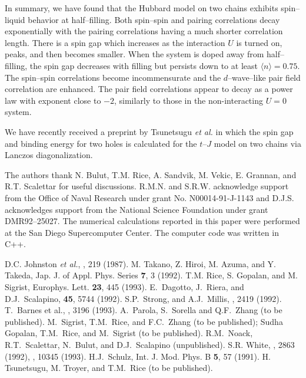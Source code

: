 In summary, we have found that
the Hubbard model on two chains exhibits spin--liquid behavior at
half--filling.
Both spin--spin and pairing correlations decay
exponentially with the pairing correlations having a much shorter
correlation length.
There is a spin gap which increases as the interaction $U$ is turned on,
peaks, and then becomes smaller.
When the system is doped away from half--filling, the spin gap
decreases with filling but persists down to at least
$\langle n \rangle = 0.75$.
The spin--spin
correlations become incommensurate and the $d$--wave--like pair field
correlation are enhanced.
The pair field correlations appear to decay as a power law with
exponent close to $-2$, similarly to those in the non-interacting
$U=0$ system.

We have recently received a preprint by Tsunetsugu {\sl et al.}
\cite{tsunetsugu} in which the spin gap and binding energy for two
holes is
calculated for the $t$--$J$ model on two chains via Lanczos
diagonalization.


The authors thank N. Bulut, T.M. Rice, A. Sandvik, M. Vekic, E.
Grannan, and R.T. Scalettar for useful discussions.
R.M.N. and S.R.W. acknowledge support from the Office of Naval
Research under grant No. N00014-91-J-1143 and D.J.S. acknowledges support
from the National Science Foundation under grant DMR92--25027.
The numerical calculations reported in this paper were performed at
the San Diego Supercomputer Center.
The computer code was written in C++.

\newpage
\begin{references}

 D.C. Johnston {\it et al.}, , 219 (1987).
 M. Takano, Z. Hiroi, M. Azuma, and Y. Takeda, Jap. J.
of Appl. Phys. Series {\bf 7}, 3 (1992).
 T.M. Rice, S. Gopalan, and M. Sigrist, Europhys. Lett.
{\bf 23}, 445 (1993).
 E.\ Dagotto, J.\ Riera, and D.J.\ Scalapino, \prb
{\bf 45}, 5744 (1992).
 S.P.\ Strong, and A.J.\ Millis, , 2419 (1992).
 T.\ Barnes et al., , 3196 (1993).
 A.\ Parola, S.\ Sorella and Q.F.\ Zhang (to be published).
 M.\ Sigrist, T.M.\ Rice, and F.C.\ Zhang (to be published);
Sudha Gopalan, T.M.\ Rice, and M.\ Sigrist (to be published).
 R.M.\ Noack, R.T.\ Scalettar, N.\ Bulut, and D.J.\
Scalapino (unpublished).
 S.R. White, , 2863 (1992),
, 10345 (1993).
 H.J.\ Schulz, Int. J. Mod. Phys. B {\bf 5}, 57
(1991).
 H. Tsunetsugu, M. Troyer, and T.M.\ Rice (to be
published).

\end{references}

